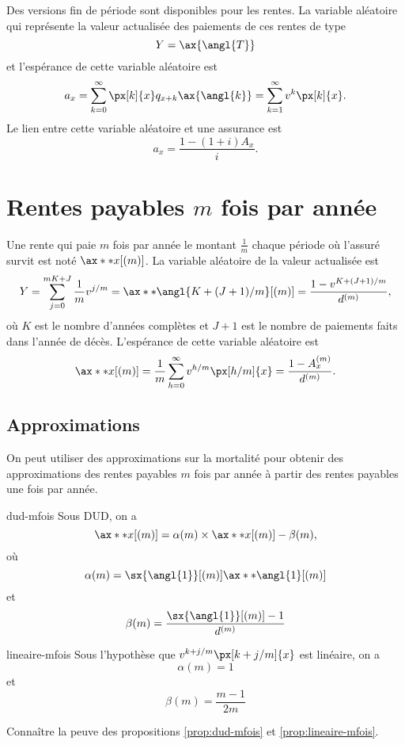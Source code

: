 Des versions fin de période sont disponibles pour les rentes. La variable aléatoire qui représente la valeur actualisée des paiements de ces rentes de type
$$ Y = \ax{\angl{T}}$$
et l'espérance de cette variable aléatoire est 
$$a_x = \sum_{k = 0}^{\infty} \px[k]{x} q_{x + k} \ax{\angl{k}} = \sum_{k = 1}^{\infty} v^k \px[k]{x}.$$
Le lien entre cette variable aléatoire et une assurance est 
$$a_x = \frac{1 - (1 + i)A_x}{i}.$$

\section{Rentes payables $m$ fois par année}

\begin{definition}{}{}
	Une rente qui paie $m$ fois par année le montant $\frac{1}{m}$ chaque période où l'assuré survit est noté $\ax**{x}[(m)]$. La variable aléatoire de la valeur actualisée est
	$$Y = \sum_{j = 0}^{mK + J}\frac{1}{m}v^{j/m} = \ax**{\angl{K + (J + 1)/m}}[(m)] = \frac{1 - v^{K + (J + 1)/m}}{d^{(m)}},$$
	où $K$ est le nombre d'années complètes et $J + 1$ est le nombre de paiements faits dans l'année de décès. L'espérance de cette variable aléatoire est 
	$$\ax**{x}[(m)] = \frac{1}{m}\sum_{h = 0}^{\infty} v^{h/m}\px[h/m]{x} = \frac{1 - A_x^{(m)}}{d^{(m)}}.$$
\end{definition}

\subsection{Approximations}

On peut utiliser des approximations sur la mortalité pour obtenir des approximations des rentes payables $m$ fois par année à partir des rentes payables une fois par année. 

\begin{proposition}{}{dud-mfois}
	Sous DUD, on a 
	$$\ax**{x}[(m)] = \alpha(m)\times \ax**{x}[(m)] - \beta(m),$$
	où 
	$$\alpha(m) = \sx{\angl{1}}[(m)]\ax**{\angl{1}}[(m)]$$
	et
	$$\beta(m) = \frac{\sx{\angl{1}}[(m)] - 1}{d^{(m)}}$$
\end{proposition}

\begin{proposition}{}{lineaire-mfois}
	Sous l'hypothèse que $v^{k + j/m}\px[k + j/m]{x}$ est linéaire, on a 
	$$\alpha(m) = 1$$
	et
	$$\beta(m) = \frac{m-1}{2m}$$
\end{proposition}

Connaître la peuve des propositions \ref{prop:dud-mfois} et \ref{prop:lineaire-mfois}.